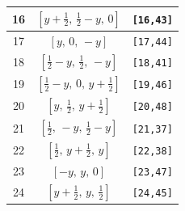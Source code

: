 \documentclass[fleqn,8pt]{jsarticle}
\begin{document}
\begin{longtable}{ccc}
16 & $\left[ y + \frac{1}{2},\, \frac{1}{2} - y,\, 0 \right]$ & {\tt [16,43]} \\ \hline
17 & $\left[ y,\, 0,\, - y \right]$ & {\tt [17,44]} \\ \hline
18 & $\left[ \frac{1}{2} - y,\, \frac{1}{2},\, - y \right]$ & {\tt [18,41]} \\ \hline
19 & $\left[ \frac{1}{2} - y,\, 0,\, y + \frac{1}{2} \right]$ & {\tt [19,46]} \\ \hline
20 & $\left[ y,\, \frac{1}{2},\, y + \frac{1}{2} \right]$ & {\tt [20,48]} \\ \hline
21 & $\left[ \frac{1}{2},\, - y,\, \frac{1}{2} - y \right]$ & {\tt [21,37]} \\ \hline
22 & $\left[ \frac{1}{2},\, y + \frac{1}{2},\, y \right]$ & {\tt [22,38]} \\ \hline
23 & $\left[ - y,\, y,\, 0 \right]$ & {\tt [23,47]} \\ \hline
24 & $\left[ y + \frac{1}{2},\, y,\, \frac{1}{2} \right]$ & {\tt [24,45]} \\
\end{longtable}
\renewcommand{\arraystretch}{1.2}
\end{document}
